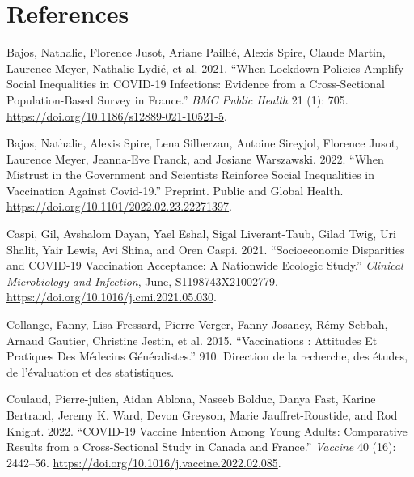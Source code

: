 \documentclass[
]{article}
\newlength{\cslhangindent}
\newlength{\cslentryspacingunit} %
\newenvironment{CSLReferences}[2] %
 {%
  \setlength{\parindent}{0pt}
  \ifodd #1
  \let\oldpar\par
  \def\par{\hangindent=\cslhangindent\oldpar}
  \fi
  \setlength{\parskip}{#2\cslentryspacingunit}
 }%
 {}
\begin{document}
\hypertarget{references}{%
\section*{References}\label{references}}

\hypertarget{refs}{}
\begin{CSLReferences}{1}{0}
\leavevmode{}%
Bajos, Nathalie, Florence Jusot, Ariane Pailhé, Alexis Spire, Claude
Martin, Laurence Meyer, Nathalie Lydié, et al. 2021. {``When Lockdown
Policies Amplify Social Inequalities in {COVID-19} Infections: Evidence
from a Cross-Sectional Population-Based Survey in {France}.''} \emph{BMC
Public Health} 21 (1): 705.
\url{https://doi.org/10.1186/s12889-021-10521-5}.

\leavevmode{}%
Bajos, Nathalie, Alexis Spire, Lena Silberzan, Antoine Sireyjol,
Florence Jusot, Laurence Meyer, Jeanna-Eve Franck, and Josiane
Warszawski. 2022. {``When Mistrust in the Government and Scientists
Reinforce Social Inequalities in Vaccination Against {Covid-19}.''}
Preprint. {Public and Global Health}.
\url{https://doi.org/10.1101/2022.02.23.22271397}.

\leavevmode{}%
Caspi, Gil, Avshalom Dayan, Yael Eshal, Sigal Liverant-Taub, Gilad Twig,
Uri Shalit, Yair Lewis, Avi Shina, and Oren Caspi. 2021.
{``Socioeconomic Disparities and {COVID-19} Vaccination Acceptance: A
Nationwide Ecologic Study.''} \emph{Clinical Microbiology and
Infection}, June, S1198743X21002779.
\url{https://doi.org/10.1016/j.cmi.2021.05.030}.

\leavevmode{}%
Collange, Fanny, Lisa Fressard, Pierre Verger, Fanny Josancy, Rémy
Sebbah, Arnaud Gautier, Christine Jestin, et al. 2015. {``Vaccinations :
Attitudes Et Pratiques Des Médecins Généralistes.''} 910. {Direction de
la recherche, des études, de l'évaluation et des statistiques}.

\leavevmode{}%
Coulaud, Pierre-julien, Aidan Ablona, Naseeb Bolduc, Danya Fast, Karine
Bertrand, Jeremy K. Ward, Devon Greyson, Marie Jauffret-Roustide, and
Rod Knight. 2022. {``{COVID-19} Vaccine Intention Among Young Adults:
{Comparative} Results from a Cross-Sectional Study in {Canada} and
{France}.''} \emph{Vaccine} 40 (16): 2442--56.
\url{https://doi.org/10.1016/j.vaccine.2022.02.085}.


\end{CSLReferences}
\end{document}
